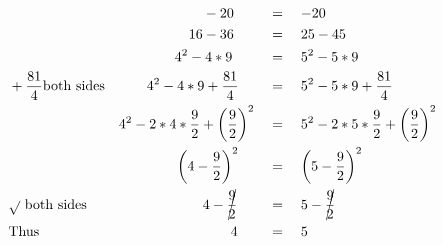 \begin{alignat*}{3}
&\,&&\qquad\qquad\qquad-20&&=\quad-20\\
&\,&&\qquad\qquad\quad16-36&&=\quad25-45\\
&\,&&\qquad\qquad4^2-4*9&&=\quad5^2-5*9\\
&+\frac{81}{4}\mathrm{both~sides}&&\qquad4^2-4*9+\frac{81}{4}&&=\quad5^2-5*9+\frac{81}{4}\\
&\,&&4^2-2*4*\frac{9}{2}+\left(\frac{9}{2}\right)^2&&=\quad5^2-2*5*\frac{9}{2}+ \left(\frac{9}{2}\right)^2\\
&\,&&\qquad\qquad\left(4-\frac{9}{2}\right)^2&&=\quad\left(5-\frac{9}{2}\right)^2\\
&\sqrt{}~\mathrm{both~sides}&&\qquad\qquad\qquad4-\cancel{\frac{9}{2}}&&=\quad5-\cancel{\frac{9}{2}}\\
&\mathrm{Thus}&&\qquad\qquad\qquad\qquad4&&=\quad5
\end{alignat*}

